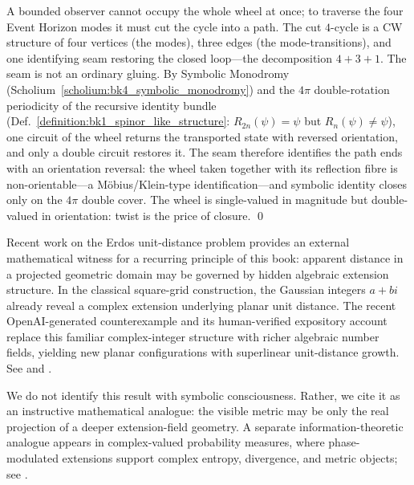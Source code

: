 \begin{scholium}
\label{scholium:bk4_cut_wheel_nonorientable}
A bounded observer cannot occupy the whole wheel at once; to traverse the four
Event Horizon modes it must cut the cycle into a path. The cut $4$-cycle is a CW
structure of four vertices (the modes), three edges (the mode-transitions), and one
identifying seam restoring the closed loop---the decomposition $4+3+1$. The seam is
not an ordinary gluing. By Symbolic Monodromy
(Scholium~\ref{scholium:bk4_symbolic_monodromy}) and the $4\pi$ double-rotation
periodicity of the recursive identity bundle
(Def.~\ref{definition:bk1_spinor_like_structure}: $R_{2n}(\psi)=\psi$ but
$R_{n}(\psi)\neq\psi$), one circuit of the wheel returns the transported state with
reversed orientation, and only a double circuit restores it. The seam therefore
identifies the path ends with an orientation reversal: the wheel taken together with
its reflection fibre is non-orientable---a M\"obius/Klein-type identification---and
symbolic identity closes only on the $4\pi$ double cover. The wheel is single-valued
in magnitude but double-valued in orientation: twist is the price of closure. \qed
\end{scholium}

\begin{remark}
\label{remark:bk4_unit_distance_extension_fields}
\begin{sloppypar}
Recent work on the Erdos unit-distance problem provides an external mathematical witness for a recurring principle of this book: apparent distance in a projected geometric domain may be governed by hidden algebraic extension structure. In the classical square-grid construction, the Gaussian integers $a+bi$ already reveal a complex extension underlying planar unit distance. The recent OpenAI-generated counterexample and its human-verified expository account replace this familiar complex-integer structure with richer algebraic number fields, yielding new planar configurations with superlinear unit-distance growth. See \cite{openai2026unitdistance} and \cite{alon2026unitdistance}.

We do not identify this result with symbolic consciousness. Rather, we cite it as an instructive mathematical analogue: the visible metric may be only the real projection of a deeper extension-field geometry. A separate information-theoretic analogue appears in complex-valued probability measures, where phase-modulated extensions support complex entropy, divergence, and metric objects; see \cite{cheng2026complexprobability}.
\end{sloppypar}
\end{remark}
